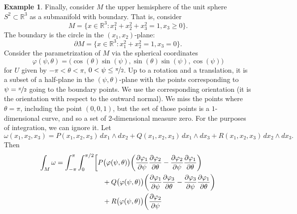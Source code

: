 \documentclass[12pt,openany]{book}
\newcommand{\R}{{\mathbb{R}}}
\theoremstyle{plain}
\theoremstyle{remark}
\theoremstyle{definition}
\theoremstyle{exercise}
\theoremstyle{example}
\newtheorem{example}[thm]{Example}
\begin{document}
\begin{example}
Finally, consider $M$
the upper hemisphere of the unit sphere $S^2 \subset \R^3$ as a submanifold
with boundary.  That is, consider
\begin{equation*}
M = \bigl\{ x \in \R^3 : x_1^2+x_2^2+x_3^2=1, x_3 \geq 0 \bigr\} .
\end{equation*}
The boundary is the circle in the $(x_1,x_2)$-plane:
\begin{equation*}
\partial M = \bigl\{ x \in \R^3 : x_1^2+x_2^2=1, x_3 = 0 \bigr\} .
\end{equation*}
Consider the parametrization of $M$
via the spherical coordinates
\begin{equation*}
\varphi(\psi,\theta) =
\bigl(\cos(\theta) \sin(\psi),
 \sin(\theta) \sin(\psi),
 \cos(\psi)\bigr)
\end{equation*}
for $U$ given by $-\pi < \theta < \pi$, $0 < \psi \leq \nicefrac{\pi}{2}$.
Up to a rotation and a translation,
it is a subset of a half-plane in the $(\psi,\theta)$-plane
with the points corresponding to
$\psi = \nicefrac{\pi}{2}$ going to the boundary points.
We use the corresponding orientation (it is the orientation with respect to
the outward normal).
We miss the
points where $\theta = \pi$, including the point $(0,0,1)$, but the set of
those points is a $1$-dimensional curve, and so a set of $2$-dimensional
measure zero. For the purposes of integration, we can ignore it.
Let
\begin{equation*}
\omega(x_1,x_2,x_3) =
P(x_1,x_2,x_3) \, dx_1 \wedge dx_2
+ Q(x_1,x_2,x_3) \, dx_1 \wedge dx_3
+ R(x_1,x_2,x_3) \, dx_2 \wedge dx_3 .
\end{equation*}
Then
\begin{equation*}
\begin{split}
\int_M \omega & =
\int_{-\pi}^\pi
\int_{0}^{\pi/2}
\biggl[
P\bigl(\varphi(\psi,\theta)\bigr) \biggl(
\frac{\partial \varphi_1}{\partial \psi}
\frac{\partial \varphi_2}{\partial \theta}
-
\frac{\partial \varphi_2}{\partial \psi}
\frac{\partial \varphi_1}{\partial \theta}
\biggr)
\\
& \hspace{2.4cm}
+
Q\bigl(\varphi(\psi,\theta)\bigr) \biggl(
\frac{\partial \varphi_1}{\partial \psi}
\frac{\partial \varphi_3}{\partial \theta}
-
\frac{\partial \varphi_3}{\partial \psi}
\frac{\partial \varphi_1}{\partial \theta}
\biggr)
\\
& \hspace{2.4cm}
+
R\bigl(\varphi(\psi,\theta)\bigr) \biggl(
\frac{\partial \varphi_2}{\partial \psi}

\end{split}
\end{equation*}
\end{example}
\end{document}

